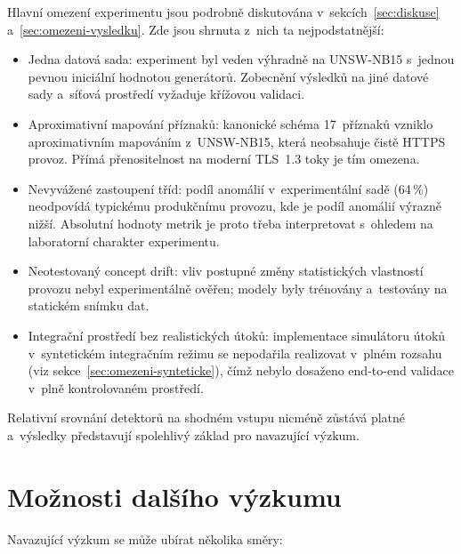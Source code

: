 Hlavní omezení experimentu jsou podrobně diskutována v~sekcích~\ref{sec:diskuse} a~\ref{sec:omezeni-vysledku}. Zde jsou shrnuta z~nich ta nejpodstatnější:

\begin{itemize}
\item Jedna datová sada: experiment byl veden výhradně na UNSW-NB15 s~jednou pevnou iniciální hodnotou generátorů. Zobecnění výsledků na jiné datové sady a~síťová prostředí vyžaduje křížovou validaci.

\item Aproximativní mapování příznaků: kanonické schéma 17~příznaků vzniklo aproximativním mapováním z~UNSW-NB15, která neobsahuje čistě HTTPS provoz. Přímá přenositelnost na moderní TLS~1.3 toky je tím omezena.

\item Nevyvážené zastoupení tříd: podíl anomálií v~experimentální sadě (64\,\%) neodpovídá typickému produkčnímu provozu, kde je podíl anomálií výrazně nižší. Absolutní hodnoty metrik je proto třeba interpretovat s~ohledem na laboratorní charakter experimentu.

\item Neotestovaný concept drift: vliv postupné změny statistických vlastností provozu nebyl experimentálně ověřen; modely byly trénovány a~testovány na statickém snímku dat.

\item Integrační prostředí bez realistických útoků: implementace simulátoru útoků v~syntetickém integračním režimu se nepodařila realizovat v~plném rozsahu (viz sekce~\ref{sec:omezeni-synteticke}), čímž nebylo dosaženo end-to-end validace v~plně kontrolovaném prostředí.
\end{itemize}

Relativní srovnání detektorů na shodném vstupu nicméně zůstává platné a~výsledky představují spolehlivý základ pro navazující výzkum.

\section*{Možnosti dalšího výzkumu}

Navazující výzkum se může ubírat několika směry:


